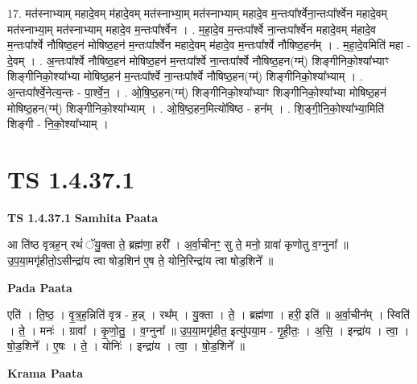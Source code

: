\documentclass[17pt]{extarticle}
\begin{document}
17. मत॑स्नाभ्याम् महादे॒वम् म॑हादे॒वम् मत॑स्नाभ्या॒म् मत॑स्नाभ्याम् महादे॒व म॒न्तःपा᳚र्श्वेना॒न्तःपा᳚र्श्वेन महादे॒वम् मत॑स्नाभ्या॒म् मत॑स्नाभ्याम् महादे॒व म॒न्तःपा᳚र्श्वेन । . म॒हा॒दे॒व म॒न्तःपा᳚र्श्वे ना॒न्तःपा᳚र्श्वेन महादे॒वम् म॑हादे॒व म॒न्तःपा᳚र्श्वे नौषिष्ठ॒हन॑ मोषिष्ठ॒हन॑ म॒न्तःपा᳚र्श्वेन महादे॒वम् म॑हादे॒व म॒न्तःपा᳚र्श्वे नौषिष्ठ॒हन᳚म् । . म॒हा॒दे॒वमिति॑ महा - दे॒वम् । . अ॒न्तःपा᳚र्श्वे नौषिष्ठ॒हन॑ मोषिष्ठ॒हन॑ म॒न्तःपा᳚र्श्वे ना॒न्तःपा᳚र्श्वे नौषिष्ठ॒हन(ग्म्॑) शिङ्गीनिको॒श्या᳚भ्याꣳ शिङ्गीनिको॒श्या᳚भ्या मोषिष्ठ॒हन॑ म॒न्तःपा᳚र्श्वे ना॒न्तःपा᳚र्श्वे नौषिष्ठ॒हन(ग्म्॑) शिङ्गीनिको॒श्या᳚भ्याम् । . अ॒न्तःपा᳚र्श्वे॒नेत्य॒न्तः - पा॒र्श्वे॒न॒ । . ओ॒षि॒ष्ठ॒हन(ग्म्॑) शिङ्गीनिको॒श्या᳚भ्याꣳ शिङ्गीनिको॒श्या᳚भ्या मोषिष्ठ॒हन॑ मोषिष्ठ॒हन(ग्म्॑) शिङ्गीनिको॒श्या᳚भ्याम् । . ओ॒षि॒ष्ठ॒हन॒मित्यो॑षिष्ठ - हन᳚म् । . शि॒ङ्गी॒नि॒को॒श्या᳚भ्या॒मिति॑ शिङ्गी - नि॒को॒श्या᳚भ्याम् । \newline
\pagebreak
{}

\section{ TS 1.4.37.1 }

\textbf{TS 1.4.37.1 } \newline
\textbf{Samhita Paata} \newline

आ ति॑ष्ठ वृत्रह॒न् रथं॑ ॅयु॒क्ता ते॒ ब्रह्म॑णा॒ हरी᳚ । अ॒र्वा॒चीनꣳ॒॒ सु ते॒ मनो॒ ग्रावा॑ कृणोतु व॒ग्नुना᳚ ॥उ॒प॒या॒मगृ॑हीतो॒ऽसीन्द्रा॑य त्वा षोड॒शिन॑ ए॒ष ते॒ योनि॒रिन्द्रा॑य त्वा षोड॒शिने᳚ ॥ \newline

\textbf{Pada Paata} \newline

एति॑ । ति॒ष्ठ॒ । वृ॒त्र॒ह॒न्निति॑ वृत्र - ह॒न्न् । रथ᳚म् । यु॒क्ता । ते॒ । ब्रह्म॑णा । हरी॒ इति॑ ॥ अ॒र्वा॒चीन᳚म् । स्विति॑ । ते॒ । मनः॑ । ग्रावा᳚ । कृ॒णो॒तु॒ । व॒ग्नुना᳚ ॥ उ॒प॒या॒मगृ॑हीत॒ इत्यु॑पया॒म - गृ॒ही॒तः॒ । अ॒सि॒ । इन्द्रा॑य । त्वा॒ । षो॒ड॒शिने᳚ । ए॒षः । ते॒ । योनिः॑ । इन्द्रा॑य । त्वा॒ । षो॒ड॒शिने᳚ ॥  \newline


\textbf{Krama Paata} \newline
\end{document}

